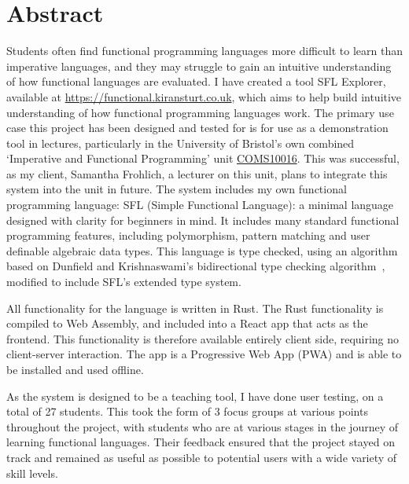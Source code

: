 \chapter*{Abstract}
Students often find functional programming languages more difficult to learn than imperative languages, and they may struggle to gain an intuitive understanding of how functional languages are evaluated. I have created a tool SFL Explorer, available at \href{https://functional.kiransturt.co.uk}{https://functional.kiransturt.co.uk}, which aims to help build intuitive understanding of how functional programming languages work. The primary use case this project has been designed and tested for is for use as a demonstration tool in lectures, particularly in the University of Bristol's own combined `Imperative and Functional Programming' unit \hyperref[COMS10016]{COMS10016}. This was successful, as my client, Samantha Frohlich, a lecturer on this unit, plans to integrate this system into the unit in future. 
The system includes my own functional programming language: SFL (Simple Functional Language): a minimal language designed with clarity for beginners in mind. It includes many standard functional programming features, including polymorphism, pattern matching and user definable algebraic data types. This language is type checked, using an algorithm based on Dunfield and Krishnaswami's bidirectional type checking algorithm~\cite{completebidir}, modified to include SFL's extended type system. 

All functionality for the language is written in Rust. The Rust functionality is compiled to Web Assembly, and included into a React app that acts as the frontend. This functionality is therefore available entirely client side, requiring no client-server interaction. The app is a Progressive Web App (PWA) and is able to be installed and used offline. 

As the system is designed to be a teaching tool, I have done user testing, on a total of 27 students. This took the form of 3 focus groups at various points throughout the project, with students who are at various stages in the journey of learning functional languages. Their feedback ensured that the project stayed on track and remained as useful as possible to potential users with a wide variety of skill levels. 



